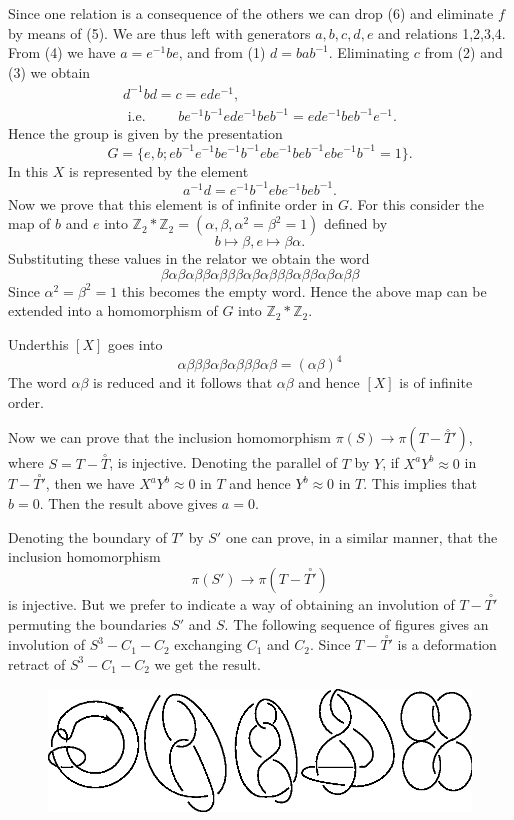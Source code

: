 Since one relation is a consequence of the others we can drop (6) and
eliminate $f$ by means of (5). We are thus left with generators $a,
b, c, d, e$ and relations 1,2,3,4. From (4) we have $a= e^{-1}
be$, and from (1) $d = bab^{-1}$. Eliminating $c$ from (2) and (3) we
obtain 
\begin{gather*}
d^{-1} bd = c = ede^{-1},\\
\text{ i.e. } \qquad be^{-1} b^{-1} ede^{-1}beb^{-1} = ede^{-1}
beb^{-1} e^{-1}. 
  \end{gather*}  
Hence the group is given by the presentation
$$
G =\{ e, b; eb^{-1} e^{-1} be^{-1} b^{-1} ebe^{-1} beb^{-1} ebe^{-1}
b^{-1} = 1 \}. 
$$
In this $X$ is represented by the element
$$
a^{-1} d = e^{-1} b^{-1} ebe^{-1} beb^{-1}. 
$$
Now we prove that this element is of infinite order in $G$. For this
consider the map of $b$ and $e$ into $\mathbb{Z}_2 \ast \mathbb{Z}_2 =
(\alpha, \beta, \alpha ^2 = \beta^2 = 1)$ defined by 
$$
b \mapsto \beta, e \mapsto \beta \alpha. 
$$
Substituting these values in the relator we obtain the word
$$
\beta \alpha \beta \alpha \beta\beta \alpha \beta\beta\beta \alpha
\beta \alpha \beta\beta\beta \alpha \beta\beta \alpha \beta \alpha
\beta\beta 
$$
Since $\alpha^2 = \beta^2 =1$ this becomes the empty word. Hence
the above map can be extended into a homomorphism of $G$ into
$\mathbb{Z}_2 \ast \mathbb{Z}_{2}$. 

Under\pageoriginale this $[X]$ goes into
$$
\alpha \beta\beta\beta \alpha \beta \alpha \beta\beta\beta \alpha
\beta = (\alpha \beta)^4 
$$ 
The word $\alpha \beta$ is reduced and it follows that $\alpha \beta$
and hence $[X]$ is of infinite order. 

Now we can prove that the inclusion homomorphism $\pi (S) \to \pi (T -
\overset{\circ}{T}')$, where $S = T - \overset{\circ}{T}$, is
injective. Denoting the  parallel of $T$ by $Y$, if $X^a Y^b \approx
0$ in $T - \overset{\circ}{T'}$, then we have $X^a Y^b \approx 0$ in $T$
and hence $Y^b \approx 0$ in $T$. This implies that $b = 0$. Then the
result above gives $a = 0$. 

Denoting the boundary of $T'$  by $S'$ one can prove, in a similar
manner, that the inclusion homomorphism  
$$
\pi (S') \to \pi (T - \overset{\circ}{T'})
$$
is injective. But we prefer to indicate a way of obtaining an
involution of $T -\overset{\circ}{T'}$ permuting the boundaries $S'$ and
$S$. The  following sequence of figures gives an involution of $S^3 -
C_1 - C_2$ exchanging $C_1$ and $C_2$. Since $T - \overset{\circ}{T'}$ is
a deformation retract of $S^3 - C_1 - C_2$ we get the result.
\begin{figure}[H]
\centering
\includegraphics{vol44-fig/fig44-15.eps}
\end{figure}

